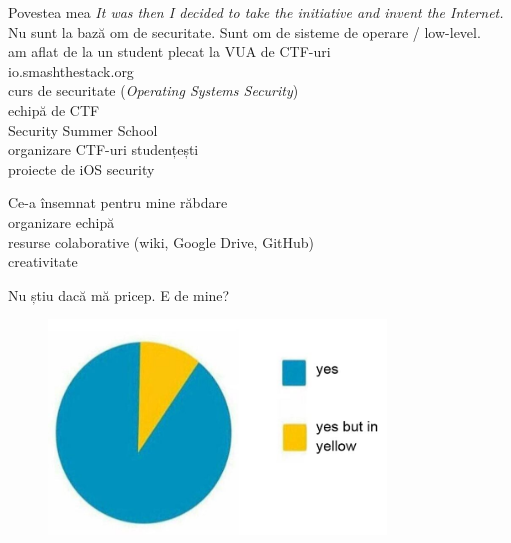 \documentclass{simple}
\begin{document}
\begin{frame}{Povestea mea}
  \centering
  \pause
  \vspace{0.3cm}
  \textit{It was then I decided to take the initiative and invent the Internet.} \\
  \pause
  \vspace{0.3cm}
  Nu sunt la bază om de securitate. Sunt om de sisteme de operare / low-level. \\
  \pause
  \vspace{0.3cm}
  am aflat de la un student plecat la VUA de CTF-uri \\
  \pause
  \vspace{0.3cm}
  io.smashthestack.org \\
  \pause
  \vspace{0.3cm}
  curs de securitate (\textit{Operating Systems Security}) \\
  \pause
  \vspace{0.3cm}
  echipă de CTF \\
  \pause
  \vspace{0.3cm}
  Security Summer School \\
  \pause
  \vspace{0.3cm}
  organizare CTF-uri studențești \\
  \pause
  \vspace{0.3cm}
  proiecte de iOS security
\end{frame}

\begin{frame}{Ce-a însemnat pentru mine}
  \centering
  \pause
  \vspace{0.5cm}
  răbdare \\
  \pause
  \vspace{0.5cm}
  organizare echipă \\
  \pause
  \vspace{0.5cm}
  resurse colaborative (wiki, Google Drive, GitHub) \\
  \pause
  \vspace{0.5cm}
  creativitate
\end{frame}

\begin{frame}{Nu știu dacă mă pricep. E de mine?}
  \begin{figure}[!htbp]
    \centering
    \includegraphics[width=0.8\textwidth]{img/yes-yes-yellow.jpg}
  \end{figure}
\end{frame}
\end{document}
